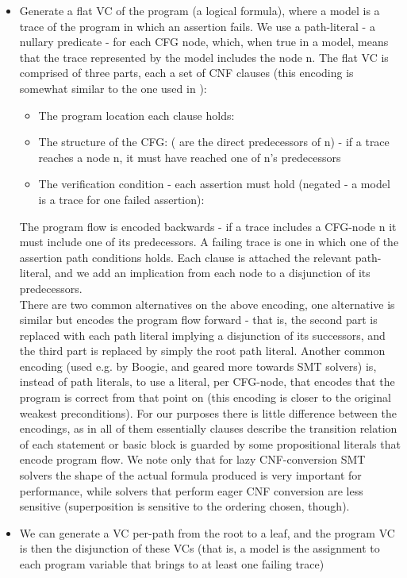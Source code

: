 \begin{itemize}
	\item Generate a flat VC of the program (a logical formula), where a model is a trace of the program in which an assertion fails. We use a path-literal - a nullary predicate  - for each CFG node, which, when true in a model, means that the trace represented by the model includes the node n. The flat VC is comprised of three parts, each a set of CNF clauses (this encoding is somewhat similar to the one used in \cite{DBLP:conf/nfm/GurfinkelCS11}):
	\begin{itemize}
		\item The program location each clause holds: \\
		\item The structure of the CFG: ( are the direct predecessors of n) - if a trace reaches a node n, it must have reached one of n's predecessors \\
		\item The verification condition - each assertion must hold (negated - a model is a trace for one failed assertion): \\
	\end{itemize}
	The program flow is encoded backwards - if a trace includes a CFG-node n it must include one of its predecessors. A failing trace is one in which one of the assertion path conditions holds. 
	Each clause is attached the relevant path-literal, and we add an implication from each node to a disjunction of its predecessors. \\
	There are two common alternatives on the above encoding, one alternative is similar but encodes the program flow forward - that is, the second part is replaced with each path literal implying a disjunction of its successors, and the third part is replaced by simply the root path literal. Another common encoding (used e.g. by Boogie, and geared more towards SMT solvers) is, instead of path literals, to use a literal, per CFG-node, that encodes that the program is correct from that point on (this encoding is closer to the original weakest preconditions). For our purposes there is little difference between the encodings, as in all of them essentially clauses describe the transition relation of each statement or basic block is guarded by some propositional literals that encode program flow. 
	We note only that for lazy CNF-conversion SMT solvers the shape of the actual formula produced is very important for performance, 
	while solvers that perform eager CNF conversion are less sensitive (superposition is sensitive to the ordering chosen, though).
	\item We can generate a VC per-path from the root to a leaf, and the program VC is then the disjunction of these VCs
	(that is, a model is the assignment to each program variable that brings to at least one failing trace)
	

\end{itemize}
